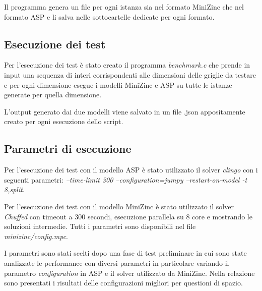 \documentclass[12pt]{article}
\begin{document}
    Il programma genera un file per ogni istanza sia nel formato MiniZinc che nel formato ASP e li salva nelle sottocartelle dedicate per ogni formato.

    \subsection{Esecuzione dei test}\label{subsec:esecuzione-dei-test}
    Per l'esecuzione dei test è stato creato il programma \textit{benchmark.c} che prende in input una sequenza di interi corrispondenti alle dimensioni delle griglie da testare e per ogni dimensione esegue i modelli MiniZinc e ASP su tutte le istanze generate per quella dimensione.

    L'output generato dai due modelli viene salvato in un file .json appositamente creato per ogni esecuzione dello script.

    \subsection{Parametri di esecuzione}\label{subsec:parametri-di-esecuzione}
    Per l'esecuzione dei test con il modello ASP è stato utilizzato il solver \textit{clingo} con i seguenti parametri: \textit{--time-limit 300 --configuration=jumpy --restart-on-model -t 8,split}.

    Per l'esecuzione dei test con il modello MiniZinc è stato utilizzato il solver \textit{Chuffed} con timeout a 300 secondi, esecuzione parallela su 8 core e mostrando le soluzioni intermedie.
    Tutti i parametri sono disponibili nel file \textit{minizinc/config.mpc}.

    I parametri sono stati scelti dopo una fase di test preliminare in cui sono state analizzate le performance con diversi parametri in particolare variando il parametro \textit{configuration} in ASP e il solver utilizzato da MiniZinc.
    Nella relazione sono presentati i risultati delle configurazioni migliori per questioni di spazio.

    
\end{document}
